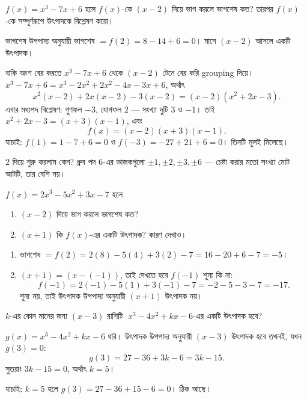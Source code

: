 \documentclass[11pt]{article}
\begin{document}
\begin{example}
$f(x) = x^{3} - 7x + 6$ হলে $f(x)$-কে $(x - 2)$ দিয়ে ভাগ করলে ভাগশেষ কত?
তারপর $f(x)$-কে সম্পূর্ণরূপে উৎপাদকে বিশ্লেষণ করো।
\end{example}

\begin{solbox}
ভাগশেষ উপপাদ্য অনুযায়ী ভাগশেষ $= f(2) = 8 - 14 + 6 = 0$। মানে $(x-2)$
আসলে একটি উৎপাদক।

বাকি অংশ বের করতে $x^{3} - 7x + 6$ থেকে $(x-2)$ টেনে বের করি grouping দিয়ে।
$x^{3} - 7x + 6 = x^{3} - 2x^{2} + 2x^{2} - 4x - 3x + 6$, অর্থাৎ
\[
  x^{2}(x - 2) + 2x(x - 2) - 3(x - 2) = (x - 2)(x^{2} + 2x - 3).
\]
এবার মধ্যপদ বিশ্লেষণ: গুণফল $-3$, যোগফল $2$ --- সংখ্যা দুটি $3$ ও $-1$। তাই
$x^{2} + 2x - 3 = (x + 3)(x - 1)$, এবং
\[
  f(x) = (x - 2)(x + 3)(x - 1).
\]
যাচাই: $f(1) = 1 - 7 + 6 = 0$ ও $f(-3) = -27 + 21 + 6 = 0$। তিনটি মূলই মিলেছে।

$2$ দিয়ে শুরু করলাম কেন? ধ্রুব পদ $6$-এর ভাজকগুলো $\pm 1, \pm 2, \pm 3, \pm 6$
--- চেষ্টা করার মতো সংখ্যা মোট আটটি, তার বেশি নয়।
\end{solbox}

 $f(x) = 2x^{3} - 5x^{2} + 3x - 7$ হলে
\begin{enumerate}
  \item $(x - 2)$ দিয়ে ভাগ করলে ভাগশেষ কত?
  \item $(x + 1)$ কি $f(x)$-এর একটি উৎপাদক? কারণ দেখাও।
\end{enumerate}

\begin{sol}
\begin{enumerate}
  \item ভাগশেষ $= f(2) = 2(8) - 5(4) + 3(2) - 7 = 16 - 20 + 6 - 7 = -5$।
  \item $(x+1) = (x - (-1))$, তাই দেখতে হবে $f(-1)$ শূন্য কি না:
        \[
          f(-1) = 2(-1) - 5(1) + 3(-1) - 7 = -2 - 5 - 3 - 7 = -17 .
        \]
        শূন্য নয়, তাই উৎপাদক উপপাদ্য অনুযায়ী $(x+1)$ উৎপাদক নয়।
\end{enumerate}
\end{sol}

 $k$-এর কোন মানের জন্য $(x - 3)$ রাশিটি
$\;x^{3} - 4x^{2} + kx - 6$-এর একটি উৎপাদক হবে?

\begin{sol}
$g(x) = x^{3} - 4x^{2} + kx - 6$ ধরি। উৎপাদক উপপাদ্য অনুযায়ী $(x-3)$ উৎপাদক
হবে তখনই, যখন $g(3) = 0$:
\[
  g(3) = 27 - 36 + 3k - 6 = 3k - 15 .
\]
সুতরাং $3k - 15 = 0$, অর্থাৎ $k = 5$।

যাচাই: $k = 5$ হলে $g(3) = 27 - 36 + 15 - 6 = 0$। ঠিক আছে।
\end{sol}
\end{document}
